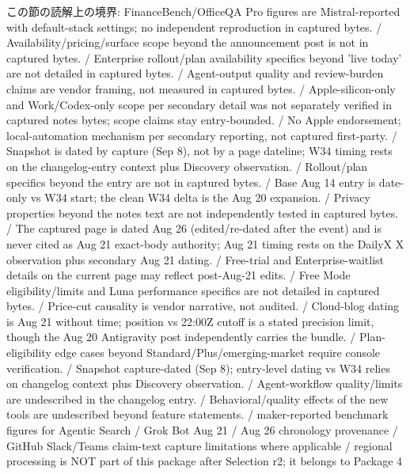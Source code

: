 \begin{claimboundary}[読解上の境界]
この節の読解上の境界: FinanceBench/OfficeQA Pro figures are Mistral-reported with default-stack settings; no independent reproduction in captured bytes. / Availability/pricing/surface scope beyond the announcement post is not in captured bytes. / Enterprise rollout/plan availability specifics beyond 'live today' are not detailed in captured bytes. / Agent-output quality and review-burden claims are vendor framing, not measured in captured bytes. / Apple-silicon-only and Work/Codex-only scope per secondary detail was not separately verified in captured notes bytes; scope claims stay entry-bounded. / No Apple endorsement; local-automation mechanism per secondary reporting, not captured first-party. / Snapshot is dated by capture (Sep 8), not by a page dateline; W34 timing rests on the changelog-entry context plus Discovery observation. / Rollout/plan specifics beyond the entry are not in captured bytes. / Base Aug 14 entry is date-only vs W34 start; the clean W34 delta is the Aug 20 expansion. / Privacy properties beyond the notes text are not independently tested in captured bytes. / The captured page is dated Aug 26 (edited/re-dated after the event) and is never cited as Aug 21 exact-body authority; Aug 21 timing rests on the DailyX X observation plus secondary Aug 21 dating. / Free-trial and Enterprise-waitlist details on the current page may reflect post-Aug-21 edits. / Free Mode eligibility/limits and Luna performance specifics are not detailed in captured bytes. / Price-cut causality is vendor narrative, not audited. / Cloud-blog dating is Aug 21 without time; position vs 22:00Z cutoff is a stated precision limit, though the Aug 20 Antigravity post independently carries the bundle. / Plan-eligibility edge cases beyond Standard/Plus/emerging-market require console verification. / Snapshot capture-dated (Sep 8); entry-level dating vs W34 relies on changelog context plus Discovery observation. / Agent-workflow quality/limits are undescribed in the changelog entry. / Behavioral/quality effects of the new tools are undescribed beyond feature statements. / maker-reported benchmark figures for Agentic Search / Grok Bot Aug 21 / Aug 26 chronology provenance / GitHub Slack/Teams claim-text capture limitations where applicable / regional processing is NOT part of this package after Selection r2; it belongs to Package 4
\end{claimboundary}
